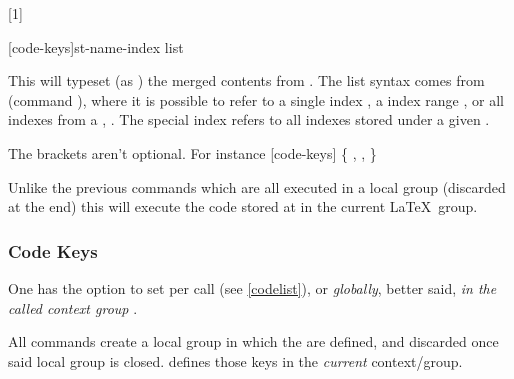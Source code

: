 \documentclass{article}
\begin{document}
[1]



\begin{codedescribe}[code,new=2025/04/29]{\tsmergedcode*}
	\begin{codesyntax}%
		\tsmacro{\tsmergedcode*}[code-keys]{st-name-index list}
	\end{codesyntax}
This will typeset (as \tsobj{\tscode}) the merged contents from . The list syntax comes from  (command \tsobj{\mergesc}), where it is possible to refer to a single index , a index range , or all indexes from a , . The special index  refers to all indexes stored under a given .
\end{codedescribe}
\begin{tsremark}
  The brackets aren't optional. For instance \tsmacro{\tsmergedcode*}[code-keys]{} {\color{red}\{}  ,  ,  {\color{red}\}}

\end{tsremark}


\begin{codedescribe}[code,new=2025/04/29]{\tsexec}
	\begin{codesyntax}%
		\tsargs[oarg]{index}
	\end{codesyntax}
Unlike the previous commands which are all executed in a local group (discarded at the end) this will execute the code stored at  in the current \LaTeX\  group.

\end{codedescribe}



\subsubsection{Code Keys}\label{code-keys}

\begin{codedescribe}{\setcodekeys}
	\begin{codesyntax}%
		\tsmacro{\setcodekeys}{code-keys}
	\end{codesyntax}

One has the option to set   per \tsobj{\tscode,\tsmergedcode,\tsdemo,\tsresult} call (see \ref{codelist}), or \emph{globally}, better said, \emph{in the called context group} .\\
\begin{tsremark}[N.B.:]
All \tsobj[code]{\tscode,\tsdemo} commands create a local group  in which the  are defined, and discarded once said local group is closed. \tsmacro{\setcodekeys}{} defines those keys in the \emph{current} context/group.
\end{tsremark}
\end{codedescribe}
\end{document}
